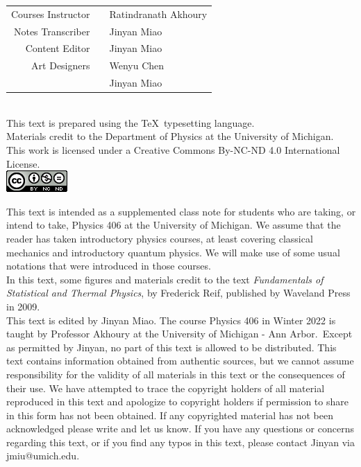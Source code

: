 \documentclass[11pt,oneside]{book}
\theoremstyle{break}
\theoremstyle{break}
\begin{document}
\begin{center}
\begin{tabular}{rcl}
Courses Instructor & & Ratindranath Akhoury \medskip
\\
Notes Transcriber & & Jinyan Miao\medskip
\\
Content Editor & & Jinyan Miao \medskip
\\
Art Designers & & Wenyu Chen \\
 & & Jinyan Miao \bigskip
\end{tabular} \\
This text is prepared using the \TeX\ typesetting language. \\
Materials credit to the Department of Physics at the University of Michigan.\\
This work is licensed under a Creative Commons By-NC-ND 4.0 International License.  \\
\medskip
\includegraphics[scale=0.8]{cclisence.png}
\end{center}
\hfill\break

This text is intended as a supplemented class note for students who are taking, or intend to take, Physics 406 at the University of Michigan. We assume that the reader has taken introductory physics courses, at least covering classical mechanics and introductory quantum physics. We will make use of some usual notations that were introduced in those courses.\\

In this text, some figures and materials credit to the text \textit{Fundamentals of Statistical and Thermal Physics}, by Frederick Reif, published by Waveland Press in 2009.\\

This text is edited by Jinyan Miao. The course Physics 406 in Winter 2022 is taught by Professor Akhoury at the University of Michigan - Ann Arbor.\ Except as permitted by Jinyan, no part of this text is allowed to be distributed. This text contains information obtained from authentic sources, but we cannot assume responsibility for the validity of all materials in this text or the consequences of their use. We have attempted to trace the copyright holders of all material reproduced in this text and apologize to copyright holders if permission to share in this form has not been obtained. If any copyrighted material has not been acknowledged please write and let us know. If you have any questions or concerns regarding this text, or if you find any typos in this text, please contact Jinyan via jmiu@umich.edu. 
\end{document}
